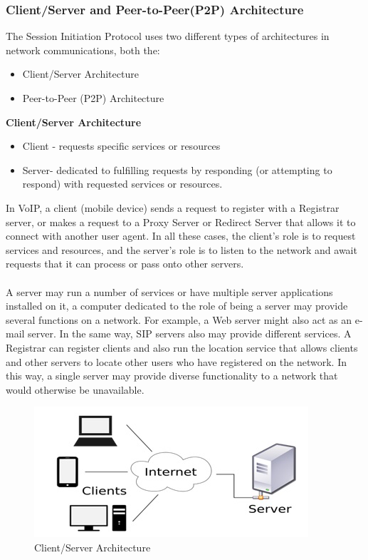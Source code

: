 \documentclass[a4paper]{article}
\begin{document}
\subsubsection{Client/Server and Peer-to-Peer(P2P) Architecture}
The Session Initiation Protocol uses two different types of architectures in network communications, both the:
\begin{itemize}
\item Client/Server Architecture
\item Peer-to-Peer (P2P) Architecture
\end{itemize}
\textbf{Client/Server Architecture}
\begin{itemize}
\item Client - requests specific services or resources
\item Server- dedicated to fulfilling requests by responding (or attempting to respond) with requested services or resources.
\end{itemize}

In VoIP, a client (mobile device) sends a request to register with a Registrar server, or makes a request to a Proxy Server or Redirect Server that allows it to connect with another user agent. In all these cases, the client’s role is to request services and resources, and the server’s role is to listen to the network and await requests that it can process or pass onto other servers.\\
\\
A server may run a number of services or have multiple server applications installed on it, a computer dedicated to the role of being a server may provide several functions on a network.
For example, a Web server might also act as an e-mail server. In the same way, SIP servers also may provide different services. A Registrar can register clients and also run the location service that allows clients and other servers to locate other users who have registered on the network. In this way, a single server may provide diverse functionality to a network that would otherwise be unavailable.

\begin{center}
\begin{figure}[H]
\includegraphics[width=1\linewidth]{./pictures/ClientServer.JPG}
\caption{\label{fig:Client/Server Architecture} Client/Server Architecture}
\end{figure}
\end{center}
\end{document}
